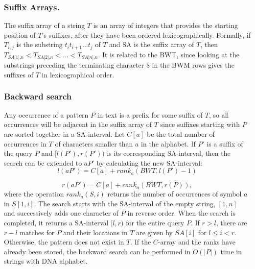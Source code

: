 \documentclass[runningheads,a4paper]{llncs}
\begin{document}
\subsubsection{Suffix Arrays.} The suffix array of a string $T$ is an array of integers that provides the starting position of $T$'s suffixes, after they have been ordered lexicographically. Formally, if $T_{i,j}$ is the substring $t_i t_{i+1} \ldots t_j$ of $T$ and SA is the suffix array of $T$, then $T_{\textit{SA[1],n}}<T_{\textit{SA[2],n}}<\ldots <T_{\textit{SA[n],n}}$. It is related to the BWT, since looking at the substrings preceding the terminating character $\$$ in the BWM rows gives the suffixes of $T$ in lexicographical order. 
\subsubsection{Backward search}
Any occurrence of a pattern $P$ in text is a prefix for some suffix of $T$, so all occurrences will be adjacent in the suffix array of $T$ since suffixes starting with $P$ are sorted together in a SA-interval. Let $C[a]$ be the total number of occurrences in $T$ of characters smaller than $a$ in the alphabet. If $P'$ is a suffix of the query $P$ and $[l(P'),r(P'))$ is its corresponding SA-interval, then the search can be extended to $aP'$ by calculating the new SA-interval:
\newline
\begin{equation} 
l(aP')=C[a]+rank_{a}(BWT,l(P')-1)
\end{equation} 

\begin{equation} 
r(aP')=C[a]+rank_{a}(BWT,r(P)),
\end{equation}
where the operation $rank_a(S,i)$ returns the number of occurrences of symbol $a$ in $S[1,i]$. The search starts with the SA-interval of the empty string, $[1,n]$ and successively adds one character of $P$ in reverse order. When the search is completed, it returns a SA-interval $[l,r)$ for the entire query $P$. If $r > l$, there are $r-l$ matches for $P$ and their locations in $T$ are given by $SA[i]$ for $l \leq i < r$. Otherwise, the pattern does not exist in $T$. If the $C$-array and the ranks have already been stored, the backward search can be performed in $O(|P|)$ time in strings with DNA alphabet.
\end{document}

